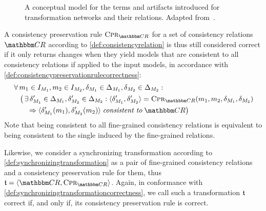 \begin{figure}
    \centering
    
    \caption[Conceptual model for transformation networks]{A conceptual model for the terms and artifacts introduced for transformation networks and their relations. Adapted from~.}
    \label{fig:correctness:conceptual_model}
\end{figure}

A consistency preservation rule $\consistencypreservationrule{\consistencyrelationset{CR}}$ for a set of consistency relations $\consistencyrelationset{CR}$ according to \autoref{def:consistencyrelation} is thus still considered correct if it only returns changes when they yield models that are consistent to all consistency relations if applied to the input models, in accordance with \autoref{def:consistencypreservationrulecorrectness}:
\begin{align*}
    &
    \forall \model{m}{1} \in \metamodelinstanceset{M}{1}, \model{m}{2} \in \metamodelinstanceset{M}{2}, \change{\metamodel{M}{1}} \in \changeuniverse{\metamodel{M}{1}}, \change{\metamodel{M}{2}} \in \changeuniverse{\metamodel{M}{2}} : %
    \\
    & \formulaskip
    \big( \exists \change{\metamodel{M}{1}}' \in \changeuniverse{\metamodel{M}{1}}, \change{\metamodel{M}{2}}' \in \changeuniverse{\metamodel{M}{2}} : \tupled{\change{\metamodel{M}{1}}', \change{\metamodel{M}{2}}'} = \consistencypreservationrule{\consistencyrelationset{CR}}(\model{m}{1}, \model{m}{2}, \change{\metamodel{M}{1}}, \change{\metamodel{M}{2}}) \\
    & \formulaskip\formulaskip
    \Rightarrow \tupled{\change{\metamodel{M}{1}}'(\model{m}{1}),\change{\metamodel{M}{2}}'(\model{m}{2})} \consistenttomath \consistencyrelationset{CR} \big)
\end{align*}
Note that being consistent to all fine-grained consistency relations is equivalent to being consistent to the single \modellevelconsistencyrelation induced by the fine-grained relations.

Likewise, we consider a synchronizing transformation according to \autoref{def:synchronizingtransformation} as a pair of fine-grained consistency relations and a consistency preservation rule for them, thus $\transformation{t} = \tupled{\consistencyrelationset{CR}, \consistencypreservationrule{\consistencyrelationset{CR}}}$.
Again, in conformance with \autoref{def:synchronizingtransformationcorrectness}, we call such a transformation $\transformation{t}$ correct if, and only if, its consistency preservation rule is correct.